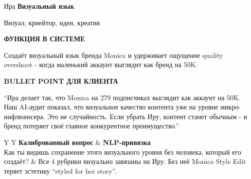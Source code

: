 \documentclass[11pt,a4paper]{article}
\newcommand{\minititle}[1]{{\sansfont\bfseries\fontsize{9.5}{11}\selectfont\color{rose}\MakeUppercase{#1}}}
\begin{document}
\vspace{3mm}

\begin{glassbox}
{\headingfont\fontsize{18}{20}\selectfont Ира}\hfill
{\sansfont\bfseries\color{emerald} Визуальный язык}

{\color{muted} Визуал, криейтор, идеи, креатив}

\vspace{2mm}
\begin{softbox}[colback=paperbg]
\minititle{Функция в системе}\par
Создаёт визуальный язык бренда Monica и удерживает ощущение quality overshoot - когда маленький аккаунт выглядит как бренд на 50K.
\end{softbox}
\vspace{2mm}
\begin{softbox}[colback=paperbg]
\minititle{Bullet Point для клиента}\par
``Ира делает так, что Monica на 279 подписчиках выглядит как аккаунт на 50K. Наш AI-аудит показал, что визуальное качество контента уже на уровне микро-инфлюенсера. Это не случайность. Если убрать Иру, контент станет обычным - и бренд потеряет своё главное конкурентное преимущество.''
\end{softbox}
\vspace{2mm}
\begin{tabularx}{\linewidth}{Y Y}
\textbf{Калиброванный вопрос} & \textbf{NLP-привязка} \\
Как ты видишь сохранение этого визуального уровня без человека, который его создаёт? & Все 4 рубрики визуально завязаны на Иру. Без неё Monica Style Edit теряет эстетику ``styled for her story''. \\
\end{tabularx}
\end{glassbox}

\vspace{3mm}
\end{document}
